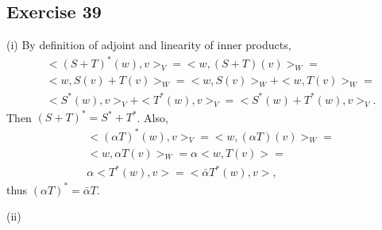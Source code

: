\documentclass[11.5pt, letterpaper, bibtotoc,
    tablecaptionabove, figurecaptionabove]{article}
\begin{document}
\subsection*{Exercise 39}
(i)
By definition of adjoint and linearity of inner products,
\begin{align*}
    &<(S+T)^*(w),v>_V=
    <w,(S+T)(v)>_W=\\
    &<w,S(v)+T(v)>_W=
    <w,S(v)>_W+<w,T(v)>_W=\\
    &<S^*(w),v>_V + <T^*(w),v>_V=
    <S^*(w)+T^*(w),v>_V.
\end{align*}
Then $(S+T)^*=S^*+T^*$.
Also,
\begin{align*}
    &<(\alpha T)^*(w),v>_V=
    <w,(\alpha T)(v)>_W=\\
    &<w,\alpha T(v)>_W=
    \alpha<w, T(v)>=\\
    &\alpha<T^*(w),v>=
    <\bar{\alpha}T^*(w),v>,
\end{align*}
thus $(\alpha T)^*=\bar{\alpha}T$.

(ii)
\end{document}
